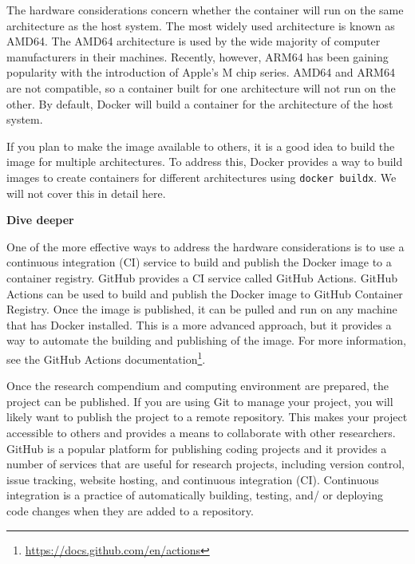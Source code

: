 \documentclass[
  letterpaper,
]{latex/krantz}
\theoremstyle{definition}
\theoremstyle{remark}
\DeclareRobustCommand{\href}[2]{#2\footnote{\url{#1}}}
\begin{document}
The hardware considerations concern whether the container will run on
the same architecture as the host system. The most widely used
architecture is known as AMD64. The AMD64 architecture is used by the
wide majority of computer manufacturers in their machines. Recently,
however, ARM64 has been gaining popularity with the introduction of
Apple's M chip series. AMD64 and ARM64 are not compatible, so a
container built for one architecture will not run on the other. By
default, Docker will build a container for the architecture of the host
system.

If you plan to make the image available to others, it is a good idea to
build the image for multiple architectures. To address this, Docker
provides a way to build images to create containers for different
architectures using \texttt{docker\ buildx}. We will not cover this in
detail here.

\begin{tcolorbox}[enhanced jigsaw, breakable, leftrule=.75mm, arc=.35mm, colframe=quarto-callout-color-frame, colback=white, left=2mm, bottomrule=.15mm, rightrule=.15mm, toprule=.15mm, opacityback=0]

\textbf{ Dive deeper}

One of the more effective ways to address the hardware considerations is
to use a continuous integration (CI) service to build and publish the
Docker image to a container registry. GitHub provides a CI service
called GitHub Actions. GitHub Actions can be used to build and publish
the Docker image to GitHub Container Registry. Once the image is
published, it can be pulled and run on any machine that has Docker
installed. This is a more advanced approach, but it provides a way to
automate the building and publishing of the image. For more information,
see the \href{https://docs.github.com/en/actions}{GitHub Actions
documentation}.

\end{tcolorbox}

Once the research compendium and computing environment are prepared, the
project can be published. If you are using Git to manage your project,
you will likely want to publish the project to a remote repository. This
makes your project accessible to others and provides a means to
collaborate with other researchers. GitHub is a popular platform for
publishing coding projects and it provides a number of services that are
useful for research projects, including version control, issue tracking,
website hosting, and continuous integration (CI). Continuous integration
is a practice of automatically building, testing, and/ or deploying code
changes when they are added to a repository.
\end{document}
